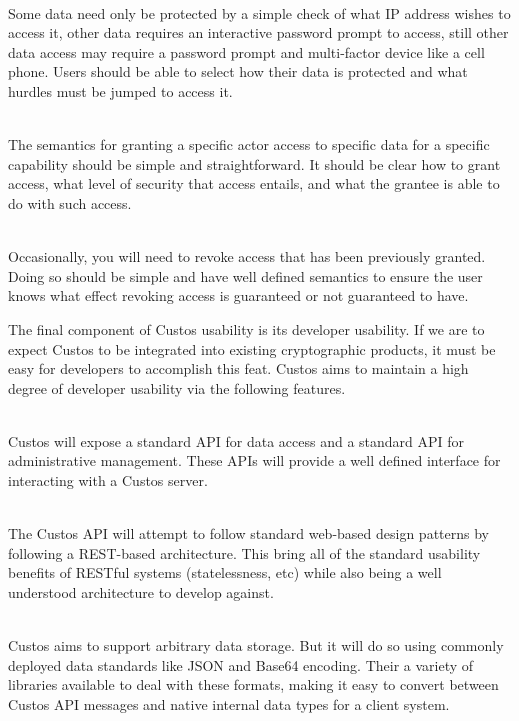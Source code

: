\begin{packed_desc}
\item[Flexible Authentication Mechanisms] \hfill \\ Some data need
  only be protected by a simple check of what IP address wishes to
  access it, other data requires an interactive password prompt to
  access, still other data access may require a password prompt and
  multi-factor device like a cell phone. Users should be able to
  select how their data is protected and what hurdles must be jumped
  to access it.
\item[Simple Access Granting] \hfill \\ The semantics for granting a
  specific actor access to specific data for a specific capability
  should be simple and straightforward. It should be clear how to
  grant access, what level of security that access entails, and what
  the grantee is able to do with such access.
\item[Simple Access Revocation] \hfill \\ Occasionally, you will need
  to revoke access that has been previously granted. Doing so should
  be simple and have well defined semantics to ensure the user knows
  what effect revoking access is guaranteed or not guaranteed to have.
\end{packed_desc}

The final component of Custos usability is its developer usability. If
we are to expect Custos to be integrated into existing cryptographic
products, it must be easy for developers to accomplish this
feat. Custos aims to maintain a high degree of developer usability via
the following features.

\begin{packed_desc}
\item[Well Defined API] \hfill \\ Custos will expose a standard API
  for data access and a standard API for administrative
  management. These APIs will provide a well defined interface for
  interacting with a Custos server.
\item[Standard Design Patterns] \hfill \\ The Custos API will attempt
  to follow standard web-based design patterns by following a
  REST-based architecture. This bring all of the standard usability
  benefits of RESTful systems (statelessness, etc) while also being a
  well understood architecture to develop against.
\item[Standard Data Formats] \hfill \\ Custos aims to support
  arbitrary data storage. But it will do so using commonly deployed
  data standards like JSON and Base64 encoding. Their a variety of
  libraries available to deal with these formats, making it easy to
  convert between Custos API messages and native internal data types
  for a client system.
\end{packed_desc}


